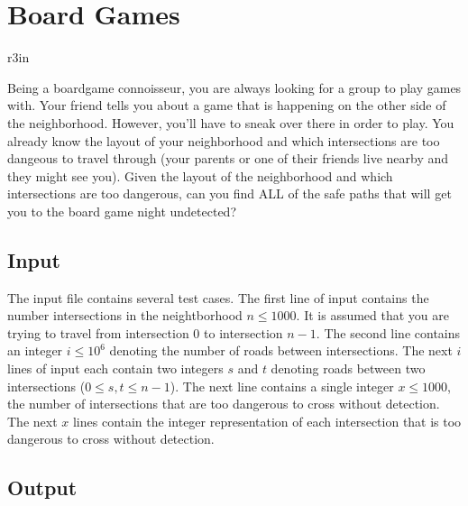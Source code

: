 \documentclass[11pt]{article}
\begin{document}
\section*{Board Games}


\begin{wrapfigure}{r}{3in}
\vspace{-10pt}
\vspace{-30pt}
\end{wrapfigure}

Being a boardgame connoisseur, you are always looking for a group to play games with. Your friend tells you about a game that is happening on the other side of the neighborhood. However, you'll have to sneak over there in order to play. You already know the layout of your neighborhood and which intersections are too dangeous to travel through (your parents or one of their friends live nearby and they might see you). Given the layout of the neighborhood and which intersections are too dangerous, can you find ALL of the safe paths that will get you to the board game night undetected?


\subsection*{Input}

The input file contains several test cases. The first line of input contains the number intersections in the neightborhood $n \leq 1000$. It is assumed that you are trying to travel from intersection $0$ to intersection $n-1$. The second line contains an integer $i \leq 10^6$ denoting the number of roads between intersections. The next $i$ lines of input each contain two integers $s$ and $t$ denoting roads between two intersections ($0 \leq s,t \leq n-1$). The next line contains a single integer $x \leq 1000$, the number of intersections that are too dangerous to cross without detection. The next $x$ lines contain the integer representation of each intersection that is too dangerous to cross without detection. 

\subsection*{Output}
\end{document}
